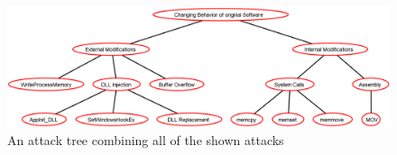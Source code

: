 \begin{figure}[!h]
	\centering
	\includegraphics[angle=90,scale=0.4,keepaspectratio]{sections/adtrees/ProcessVirtualMemoryWithoutDefenses.png}
	\caption{An attack tree combining all of the shown attacks}
	\label{fig:attacks}
\end{figure}
